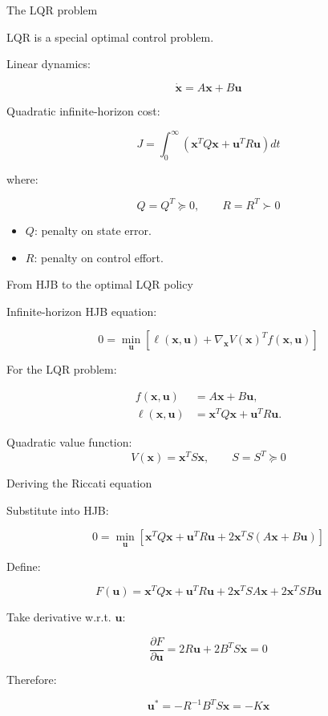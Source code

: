 \documentclass[aspectratio=169]{beamer}
\begin{document}
\begin{frame}{The LQR problem}
\large

LQR is a special optimal control problem.

\vspace{0.2cm}

Linear dynamics:

\[
\dot{\bm{x}} = A\bm{x} + B\bm{u}
\]

Quadratic infinite-horizon cost:

\[
J =
\int_0^\infty
\left(
\bm{x}^T Q \bm{x}
+
\bm{u}^T R \bm{u}
\right)dt
\]

where:

\[
Q = Q^T \succeq 0,
\qquad
R = R^T \succ 0
\]

\vspace{0.2cm}

\begin{itemize}
    \item $Q$: penalty on state error.
    \item $R$: penalty on control effort.
\end{itemize}

\end{frame}
\begin{frame}[t]{From HJB to the optimal LQR policy}
\large

Infinite-horizon HJB equation:

\[
0 =
\min_{\bm{u}}
\left[
\ell(\bm{x},\bm{u})
+
\nabla_{\bm{x}} V(\bm{x})^{T}
f(\bm{x},\bm{u})
\right]
\]

\vspace{-0.1cm}

For the LQR problem:

\[
\begin{aligned}
f(\bm{x},\bm{u}) 
&= A\bm{x}+B\bm{u}, \\[0.15cm]
\ell(\bm{x},\bm{u})
&=
\bm{x}^TQ\bm{x}
+
\bm{u}^TR\bm{u}.
\end{aligned}
\]

\vspace{-0.1cm}

Quadratic value function:
\[
V(\bm{x}) = \bm{x}^T S \bm{x},
\qquad
S=S^T \succeq 0
\]
\end{frame}
\begin{frame}{Deriving the Riccati equation}
\large

Substitute into HJB:

\[
0 =
\min_{\bm{u}}
\left[
\bm{x}^TQ\bm{x}
+
\bm{u}^TR\bm{u}
+
2\bm{x}^T S(A\bm{x}+B\bm{u})
\right]
\]

Define:

\[
F(\bm{u})
=
\bm{x}^TQ\bm{x}
+
\bm{u}^TR\bm{u}
+
2\bm{x}^TSA\bm{x}
+
2\bm{x}^TSB\bm{u}
\]

Take derivative w.r.t. $\bm{u}$:

\[
\frac{\partial F}{\partial \bm{u}}
=
2R\bm{u}
+
2B^TS\bm{x}
=
0
\]

Therefore:

\[
\bm{u}^*
=
-R^{-1}B^TS\bm{x}
=
-K\bm{x}
\]

\end{frame}
\end{document}

